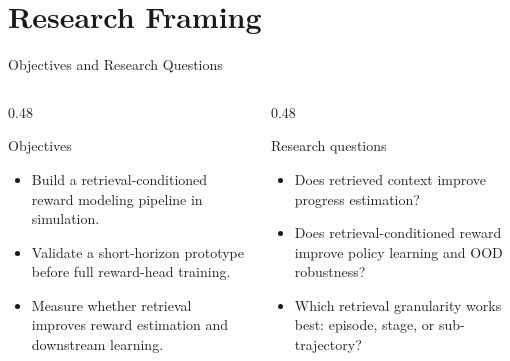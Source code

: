 \documentclass[aspectratio=169,11pt]{beamer}
\begin{document}
\section{Research Framing}
\begin{frame}[t]{Objectives and Research Questions}
\small
\begin{columns}[T,totalwidth=\textwidth]
  \begin{column}{0.48\textwidth}
    \begin{block}{Objectives}
      \begin{itemize}
        \item Build a retrieval-conditioned reward modeling pipeline in simulation.
        \item Validate a short-horizon prototype before full reward-head training.
        \item Measure whether retrieval improves reward estimation and downstream learning.
      \end{itemize}
    \end{block}
  \end{column}
  \begin{column}{0.48\textwidth}
    \begin{block}{Research questions}
      \begin{itemize}
        \item Does retrieved context improve progress estimation?
        \item Does retrieval-conditioned reward improve policy learning and OOD robustness?
        \item Which retrieval granularity works best: episode, stage, or sub-trajectory?
      \end{itemize}
    \end{block}
  \end{column}
\end{columns}
\end{frame}
\end{document}
